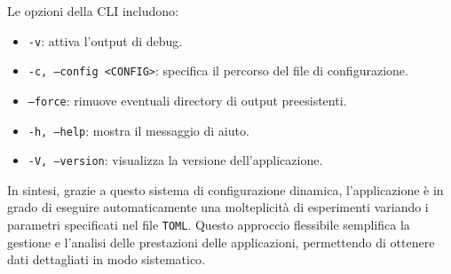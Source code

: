 \documentclass{article}
\begin{document}
Le opzioni della CLI includono:
\begin{itemize}
  \item \texttt{-v}: attiva l'output di debug.
  \item \texttt{-c, --config <CONFIG>}: specifica il percorso del file di configurazione.
  \item \texttt{--force}: rimuove eventuali directory di output preesistenti.
  \item \texttt{-h, --help}: mostra il messaggio di aiuto.
  \item \texttt{-V, --version}: visualizza la versione dell'applicazione.
\end{itemize}

In sintesi, grazie a questo sistema di configurazione dinamica, l'applicazione è in grado di eseguire automaticamente una molteplicità di esperimenti variando i parametri specificati nel file \texttt{TOML}. Questo approccio flessibile semplifica la gestione e l'analisi delle prestazioni delle applicazioni, permettendo di ottenere dati dettagliati in modo sistematico.

\clearpage
\pagestyle{plain}
\setcounter{page}{1}


\end{document}

